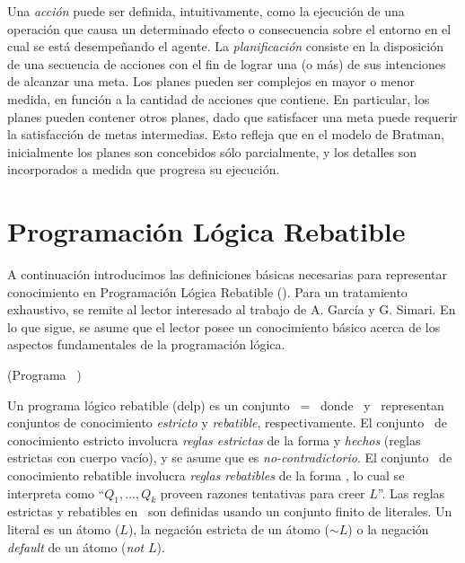  Una \textit{acción} puede ser definida, intuitivamente, como la
 ejecución de una operación que causa un determinado efecto o
 consecuencia sobre el entorno en el cual se está desempeñando el
 agente.
 La \textit{planificación} consiste  en la disposición de una secuencia
 de acciones con el fin de lograr una (o más) de sus intenciones de
 alcanzar una meta.
 Los planes pueden ser complejos en mayor o menor medida, en función a
 la cantidad de acciones que contiene.
 En  particular, los planes pueden contener otros planes, dado que
 satisfacer una meta puede requerir la satisfacción de metas
 intermedias.
 Esto refleja que en  el modelo de Bratman, inicialmente los planes son
 concebidos sólo parcialmente,  y los detalles son incorporados a
 medida que progresa su ejecución.

\section{Programación Lógica Rebatible}
 \label{sec:programacion_logica_rebatible}
 
 A continuación introducimos las definiciones básicas necesarias para
 representar conocimiento en Programación Lógica Rebatible (\DLP). Para
 un tratamiento exhaustivo, se remite al lector interesado al trabajo
 de A. García y G. Simari\cite{delp04}.  En lo que sigue, se asume que
 el lector posee un conocimiento básico acerca de los aspectos
 fundamentales de la programación lógica.

 \begin{definicion}(Programa \DLP\ \PP)
 \label{def:programa_delp}
 
 Un programa lógico rebatible (delp) es un conjunto \PP\ = \SD\ donde
 \SSet\ y \DD\ representan conjuntos de conocimiento \textit{estricto}
 y \textit{rebatible}, respectivamente. El conjunto \SSet\ de
 conocimiento estricto involucra \textit{reglas estrictas} de la forma
  y \textit{hechos} (reglas estrictas con
 cuerpo vacío), y se asume que es \textit{no-contradictorio}.  El
 conjunto \DD\ de conocimiento rebatible involucra \textit{reglas
 rebatibles} de la forma  , lo cual se
 interpreta como ``$Q_1,\ldots,Q_k$ proveen razones tentativas  para
 creer $L$''. Las reglas estrictas y rebatibles en \DLP\ son definidas
 usando un conjunto  finito de literales. Un literal es un átomo ($L$),
 la negación estricta de un átomo ($\sim L$) o  la negación
 \textit{default} de un átomo (\textit{not} $L$).
 
 \end{definicion}
 
